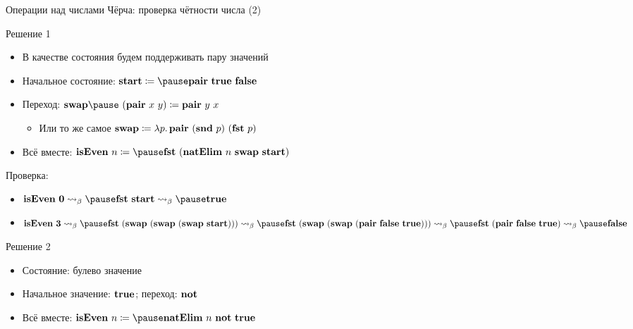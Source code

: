     \begin{frame}{Операции над числами Чёрча: проверка чётности числа (2)}
        \vspace{-0.7em}
        \begin{block}{Решение 1}
            \begin{itemize}
                \item \pause В качестве состояния \pause будем поддерживать пару значений
                \item \pause Начальное состояние: $\term{start} \termdef \pause \term{pair} \ap \term{true} \ap \term{false}$
                \item \pause Переход: \pause $\term{swap} \pause \ap (\term{pair} \ap x \ap y) \termdef \term{pair} \ap y \ap x$
                \begin{itemize}
                    \item \pause Или то же самое $\mathbf{swap} \coloneqq \lambda p\ldotp \mathbf{pair} ~ (\mathbf{snd} ~ p) ~ (\mathbf{fst} ~ p)$
                \end{itemize}
                \item \pause Всё вместе: \pause $\term{isEven} \ap n \termdef \pause \term{fst} \ap (\term{natElim} \ap n \ap \term{swap} \ap \term{start})$
            \end{itemize}
            \pause
            Проверка:
            \begin{itemize}
                \item \pause $\term{isEven} \ap \term{0} \step_\beta \pause \term{fst} \ap \term{start} \step_\beta \pause \term{true}$
                \item \pause $\term{isEven} \ap \term{3} \step_\beta \pause \term{fst} \ap (\term{swap} \ap (\term{swap} \ap (\term{swap} \ap \term{start}))) \step_\beta \pause \term{fst} \ap (\term{swap} \ap (\term{swap} \ap (\term{pair} \ap \term{false} \ap \term{true}))) \step_\beta \pause \term{fst} \ap (\term{pair} \ap \term{false} \ap \term{true}) \step_\beta \pause \term{false}$
            \end{itemize}
        \end{block}
        \vspace{-0.5em}
        \begin{block}{Решение 2}
            \begin{itemize}
                \item \pause Состояние: булево значение
                \item \pause Начальное значение: \pause $\mathbf{true}$; \pause переход: \pause $\mathbf{not}$
                \item \pause Всё вместе: \pause $\term{isEven} \ap n \termdef \pause \term{natElim} \ap n \ap \term{not} \ap \term{true}$
            \end{itemize}
        \end{block}
    \end{frame}


